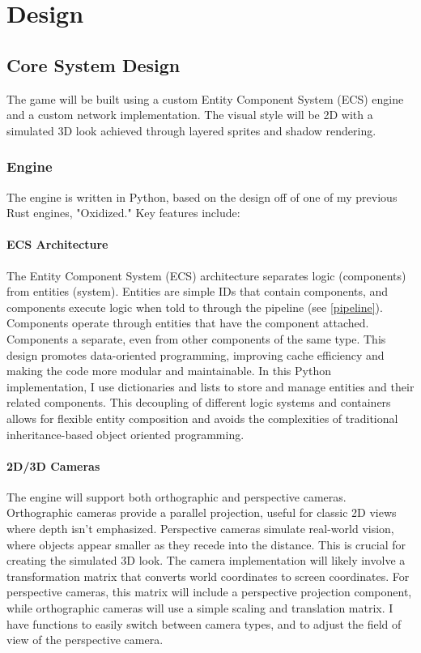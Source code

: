 \documentclass{article}
\begin{document}
\section{Design}

\subsection{Core System Design}

The game will be built using a custom Entity Component System (ECS) engine and a custom network implementation. The visual style will be 2D with a simulated 3D look achieved through layered sprites and shadow rendering.

\subsubsection{Engine}

The engine is written in Python, based on the design off of one of my previous Rust engines, "Oxidized." Key features include:

\paragraph{ECS Architecture}

The Entity Component System (ECS) architecture separates logic (components) from entities (system). Entities are simple IDs that contain components, and components execute logic when told to through the pipeline (see \ref{pipeline}). Components operate through entities that have the component attached. Components a separate, even from other components of the same type. This design promotes data-oriented programming, improving cache efficiency and making the code more modular and maintainable. In this Python implementation, I use dictionaries and lists to store and manage entities and their related components. This decoupling of different logic systems and containers allows for flexible entity composition and avoids the complexities of traditional inheritance-based object oriented programming.

\paragraph{2D/3D Cameras}
The engine will support both orthographic and perspective cameras. Orthographic cameras provide a parallel projection, useful for classic 2D views where depth isn't emphasized. Perspective cameras simulate real-world vision, where objects appear smaller as they recede into the distance. This is crucial for creating the simulated 3D look. The camera implementation will likely involve a transformation matrix that converts world coordinates to screen coordinates. For perspective cameras, this matrix will include a perspective projection component, while orthographic cameras will use a simple scaling and translation matrix. I have functions to easily switch between camera types, and to adjust the field of view of the perspective camera.
\end{document}
